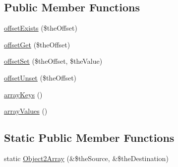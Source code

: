 \subsection*{Public Member Functions}
\begin{DoxyCompactItemize}
\item 
\hyperlink{class_ontology_wrapper_1_1_container_object_aff6fe69abda5124438458b687ab30c4f}{offset\-Exists} (\$the\-Offset)
\item 
\hyperlink{class_ontology_wrapper_1_1_container_object_a1fcd9bbec807c35973f634eb0a98ae13}{offset\-Get} (\$the\-Offset)
\item 
\hyperlink{class_ontology_wrapper_1_1_container_object_ae7c3dbc16f8e0e2bbd667c0168539a3e}{offset\-Set} (\$the\-Offset, \$the\-Value)
\item 
\hyperlink{class_ontology_wrapper_1_1_container_object_a6aec41ee5dafbd52a6e9963eb49f3e7e}{offset\-Unset} (\$the\-Offset)
\item 
\hyperlink{class_ontology_wrapper_1_1_container_object_ae27d07c2dcb4b4e95a167ef9fa6a419a}{array\-Keys} ()
\item 
\hyperlink{class_ontology_wrapper_1_1_container_object_a65780ec62aa8b6e5f699be556f9e316f}{array\-Values} ()
\end{DoxyCompactItemize}
\subsection*{Static Public Member Functions}
\begin{DoxyCompactItemize}
\item 
static \hyperlink{class_ontology_wrapper_1_1_container_object_a0af6d7a3fcaeeb50be636280e95bc2db}{Object2\-Array} (\&\$the\-Source, \&\$the\-Destination)
\end{DoxyCompactItemize}
